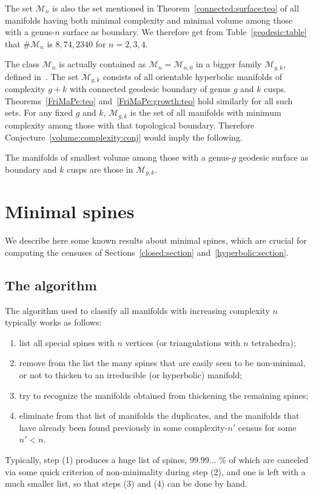 \documentclass[10pt]{article}      %
\newcommand{\calM} {\ensuremath {\mathcal{M}}}
\begin{document}
The set $\calM_n$ is also the set mentioned in Theorem~\ref{connected:surface:teo}
of all manifolds having both minimal complexity and minimal volume among those with
a genus-$n$ surface as boundary. We therefore get from Table~\ref{geodesic:table} that
$\#\calM_n$ is $8, 74, 2340$ for $n=2,3,4$.

The class $\calM_n$ is actually contained as $\calM_n = \calM_{n,0}$ in a bigger family
$\calM_{g,k}$, defined in~\cite{FriMaPe3}. The set $\calM_{g,k}$ consists of 
all orientable hyperbolic manifolds of 
complexity $g+k$ with connected geodesic boundary of genus $g$ and $k$ cusps. 
Theorems~\ref{FriMaPe:teo} and~\ref{FriMaPe:growth:teo} hold similarly for all such sets.
For any fixed $g$ and $k$, $\calM_{g,k}$ is the set of all manifolds with minimum complexity
among those with that topological boundary. Therefore Conjecture~\ref{volume:complexity:conj}
would imply the following.
\begin{conjecture} The manifolds of smallest volume
among those with a genus-$g$ geodesic surface as boundary and $k$ cusps are those in
$\calM_{g,k}$.
\end{conjecture}

\section{Minimal spines} \label{minimal:section}
We describe here some known results about minimal spines, which are crucial for computing 
the censuses of Sections~\ref{closed:section} and~\ref{hyperbolic:section}.
\subsection{The algorithm} \label{algorithm:subsection}
The algorithm used to classify all manifolds with increasing complexity $n$ typically works
as follows: 
\begin{enumerate}
\item list all special spines with $n$ vertices (or triangulations with $n$ tetrahedra);
\item remove from the list the many spines that are easily seen to be 
non-minimal, or not to thicken to an irreducible
(or hyperbolic) manifold; 
\item try to recognize the manifolds obtained from thickening
the remaining spines;
\item eliminate from that list of manifolds the duplicates, and the manifolds
that have already been found previously in some complexity-$n'$ census for some $n'<n$.
\end{enumerate}
Typically, step (1) produces a huge list of spines, $99.99\ldots$ \% of which are canceled via
some quick criterion of non-minimality during step (2), and one is left with a much smaller
list, so that steps (3) and (4) can be done by hand.
\end{document}
